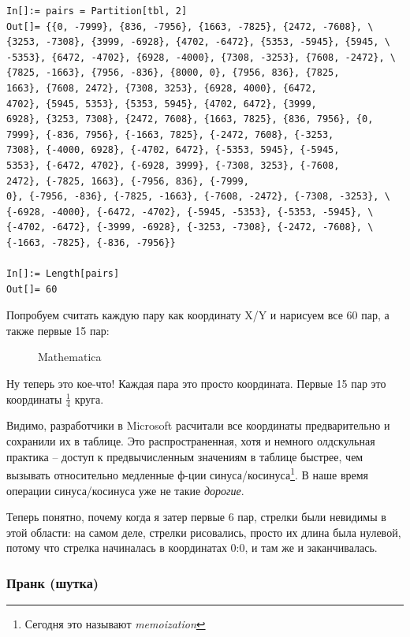 \begin{lstlisting}[style=custommath]
In[]:= pairs = Partition[tbl, 2]
Out[]= {{0, -7999}, {836, -7956}, {1663, -7825}, {2472, -7608}, \
{3253, -7308}, {3999, -6928}, {4702, -6472}, {5353, -5945}, {5945, \
-5353}, {6472, -4702}, {6928, -4000}, {7308, -3253}, {7608, -2472}, \
{7825, -1663}, {7956, -836}, {8000, 0}, {7956, 836}, {7825, 
1663}, {7608, 2472}, {7308, 3253}, {6928, 4000}, {6472, 
4702}, {5945, 5353}, {5353, 5945}, {4702, 6472}, {3999, 
6928}, {3253, 7308}, {2472, 7608}, {1663, 7825}, {836, 7956}, {0, 
7999}, {-836, 7956}, {-1663, 7825}, {-2472, 7608}, {-3253, 
7308}, {-4000, 6928}, {-4702, 6472}, {-5353, 5945}, {-5945, 
5353}, {-6472, 4702}, {-6928, 3999}, {-7308, 3253}, {-7608, 
2472}, {-7825, 1663}, {-7956, 836}, {-7999, 
0}, {-7956, -836}, {-7825, -1663}, {-7608, -2472}, {-7308, -3253}, \
{-6928, -4000}, {-6472, -4702}, {-5945, -5353}, {-5353, -5945}, \
{-4702, -6472}, {-3999, -6928}, {-3253, -7308}, {-2472, -7608}, \
{-1663, -7825}, {-836, -7956}}

In[]:= Length[pairs]
Out[]= 60
\end{lstlisting}

Попробуем считать каждую пару как координату X/Y и нарисуем все 60 пар, а также первые 15 пар:

\begin{figure}[H]
\centering
{}
\caption{Mathematica}
\end{figure}

Ну теперь это кое-что!
Каждая пара это просто координата.
Первые 15 пар это координаты $\frac{1}{4}$ круга.

Видимо, разработчики в Microsoft расчитали все координаты предварительно и сохранили их в таблице.
Это распространенная, хотя и немного олдскульная практика -- доступ к предвычисленным значениям в таблице быстрее, чем вызывать относительно медленные ф-ции
синуса/косинуса\footnote{Сегодня это называют \emph{memoization}}.
В наше время операции синуса/косинуса уже не такие \emph{дорогие}.

Теперь понятно, почему когда я затер первые 6 пар, стрелки были невидимы в этой области: на самом деле, стрелки рисовались,
просто их длина была нулевой, потому что стрелка начиналась в координатах 0:0, и там же и заканчивалась.

\subsubsection{Пранк (шутка)}

